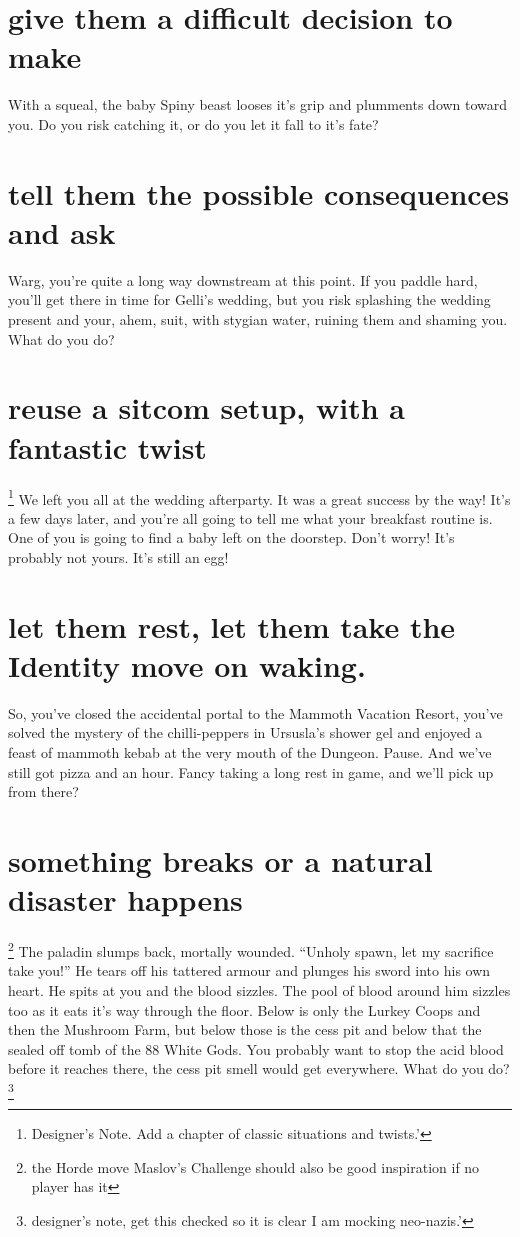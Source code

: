 \documentclass{tufte-book}
\begin{document}
\section{give them a difficult decision to make} 
With a squeal, the baby Spiny beast looses it's grip and plumments down toward you. Do you risk catching it, or do you let it fall to it's fate?

\section{tell them the possible consequences and ask} 
Warg, you're quite a long way downstream at this point. If you paddle hard, you'll get there in time for Gelli's wedding, but you risk splashing the wedding present and your, ahem, suit, with stygian water, ruining them and shaming you. What do you do?

\section{reuse a sitcom setup, with a fantastic twist} \footnote{Designer's Note. Add a chapter of classic situations and twists.'}
We left you all at the wedding afterparty. It was a great success by the way! It's a few days later, and you're all going to tell me what your breakfast routine is. One of you is going to find a baby left on the doorstep. Don't worry! It's probably not yours. It's still an egg!

\section{let them rest, let them take the Identity move on waking.} 
So, you've closed the accidental portal to the Mammoth Vacation Resort, you've solved the mystery of the chilli-peppers in Ursusla's shower gel and enjoyed a feast of mammoth kebab at the very mouth of the Dungeon. Pause. And we've still got pizza and an hour. Fancy taking a long rest in game, and we'll pick up from there? 

\section{something breaks or a natural disaster happens} \footnote{the Horde move Maslov's Challenge should also be good inspiration if no player has it}
The paladin slumps back, mortally wounded. ``Unholy spawn, let my sacrifice take you!'' He tears off his tattered armour and plunges his sword into his own heart. He spits at you and the blood sizzles. The pool of blood around him sizzles too as it eats it's way through the floor. Below is only the Lurkey Coops and then the Mushroom Farm, but below those is the cess pit and below that the sealed off tomb of the 88 White Gods. You probably want to stop the acid blood before it reaches there, the cess pit smell would get everywhere. What do you do? \footnote{designer's note, get this checked so it is clear I am mocking neo-nazis.'}
\end{document}
